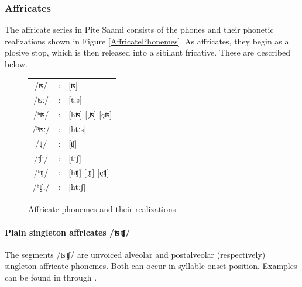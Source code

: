 \FloatBarrier

\subsubsection{Affricates}\label{Affricates}
The affricate series in Pite Saami consists of the phones and their phonetic realizations shown in Figure \vref{AffricatePhonemes}. As affricates, they begin as a plosive stop, which is then released into a sibilant fricative. %
These are described below.
\begin{figure}\centering
\begin{tabular}{c c l}
/ʦ/ &:& [ʦ] \\ %
/ʦː/ &:& [tːs] \\ %
/ʰʦ/ &:& [hʦ] [ ̥ʦ] [çʦ] \\ %
/ʰʦː/ &:& [htːs] \\ %
/ʧ/ &:& [ʧ] \\ %
/ʧː/ &:& [tːʃ] \\ %
/ʰʧ/ &:& [hʧ] [ ̥ʧ] [çʧ]  \\ %
/ʰʧː/ &:& [htːʃ] \\ %
\end{tabular}
\caption{Affricate phonemes and their realizations}\label{AffricatePhonemes}
\end{figure}

\paragraph{Plain singleton affricates /ʦ\,ʧ/}\label{tstj}
The segments /ʦ\,ʧ/ are unvoiced alveolar and postalveolar (respectively) singleton affricate phonemes. Both can occur in syllable onset position. Examples can be found in  through .

